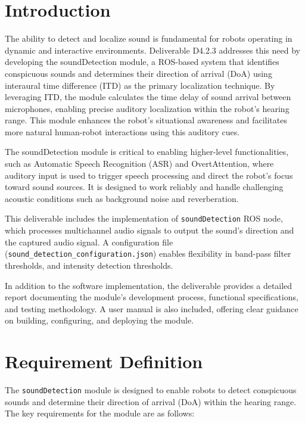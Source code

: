\documentclass{CSSRforAfrica}
\begin{document}
\section{Introduction}
The ability to detect and localize sound is fundamental for robots operating in dynamic and interactive environments. Deliverable D4.2.3 addresses this need by developing the soundDetection module, a ROS-based system that identifies conspicuous sounds and determines their direction of arrival (DoA) using interaural time difference (ITD) as the primary localization technique. By leveraging ITD, the module calculates the time delay of sound arrival between microphones, enabling precise auditory localization within the robot’s hearing range. This module enhances the robot’s situational awareness and facilitates more natural human-robot interactions using this auditory cues.

The soundDetection module is critical to enabling higher-level functionalities, such as Automatic Speech Recognition (ASR) and OvertAttention, where auditory input is used to trigger speech processing and direct the robot’s focus toward sound sources. It is designed to work reliably and handle challenging acoustic conditions such as background noise and reverberation.

This deliverable includes the implementation of \texttt{soundDetection} ROS node, which processes multichannel audio signals to output the sound’s direction and the captured audio signal. A configuration file (\texttt{sound\_detection\_configuration.json}) enables flexibility in band-pass filter thresholds, and intensity detection thresholds.

In addition to the software implementation, the deliverable provides a detailed report documenting the module's development process, functional specifications, and testing methodology. A user manual is also included, offering clear guidance on building, configuring, and deploying the module.

\newpage

\section{Requirement Definition}
The \texttt{soundDetection} module is designed to enable robots to detect conspicuous sounds and determine their direction of arrival (DoA) within the hearing range. The key requirements for the module are as follows:
\end{document}
